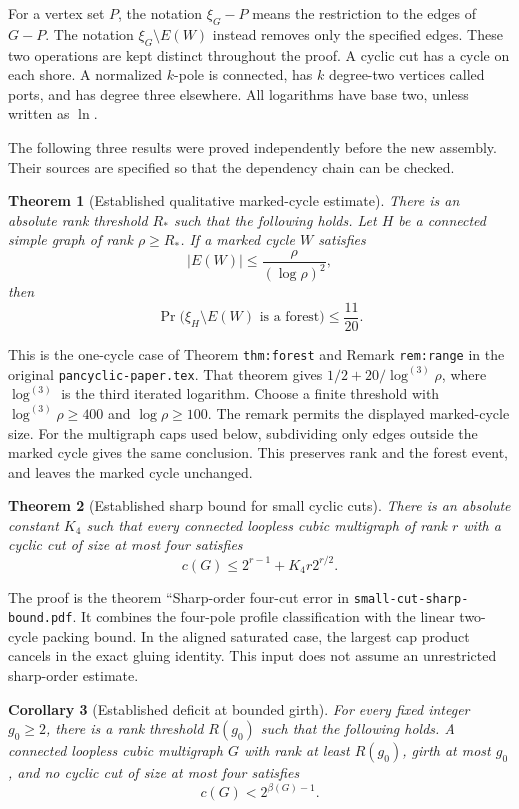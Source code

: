\documentclass[11pt]{article}
\newtheorem{theorem}{Theorem}[section]
\newtheorem{corollary}[theorem]{Corollary}
\begin{document}
For a vertex set $P$, the notation $\xi_G-P$ means the restriction to the edges of $G-P$.
The notation $\xi_G\setminus E(W)$ instead removes only the specified edges.
These two operations are kept distinct throughout the proof.
A cyclic cut has a cycle on each shore.
A normalized $k$-pole is connected, has $k$ degree-two vertices called ports, and has degree three elsewhere.
All logarithms have base two, unless written as $\ln$.

The following three results were proved independently before the new assembly.
Their sources are specified so that the dependency chain can be checked.

\begin{theorem}[Established qualitative marked-cycle estimate]
\label{thm:sharp-qualitative-forest-input}
There is an absolute rank threshold $R_*$ such that the following holds.
Let $H$ be a connected simple graph of rank $\rho\ge R_*$.
If a marked cycle $W$ satisfies
\[
 |E(W)|\le \frac{\rho}{(\log\rho)^2},
\]
then
\[
 \Pr\bigl(\xi_H\setminus E(W)\text{ is a forest}\bigr)\le\frac{11}{20}.
\]
\end{theorem}

This is the one-cycle case of Theorem \texttt{thm:forest} and Remark \texttt{rem:range} in the original \nolinkurl{pancyclic-paper.tex}.
That theorem gives $1/2+20/\log^{(3)}\rho$, where $\log^{(3)}$ is the third iterated logarithm.
Choose a finite threshold with $\log^{(3)}\rho\ge400$ and $\log\rho\ge100$.
The remark permits the displayed marked-cycle size.
For the multigraph caps used below, subdividing only edges outside the marked cycle gives the same conclusion.
This preserves rank and the forest event, and leaves the marked cycle unchanged.

\begin{theorem}[Established sharp bound for small cyclic cuts]
\label{thm:sharp-order-four-cut-error}
There is an absolute constant $K_4$ such that every connected loopless cubic multigraph of rank $r$ with a cyclic cut of size at most four satisfies
\[
 c(G)\le2^{r-1}+K_4r2^{r/2}.
\]
\end{theorem}

The proof is the theorem ``Sharp-order four-cut error in \nolinkurl{small-cut-sharp-bound.pdf}.
It combines the four-pole profile classification with the linear two-cycle packing bound.
In the aligned saturated case, the largest cap product cancels in the exact gluing identity.
This input does not assume an unrestricted sharp-order estimate.

\begin{corollary}[Established deficit at bounded girth]
\label{cor:path-unbounded-girth-reduction}
For every fixed integer $g_0\ge2$, there is a rank threshold $R(g_0)$ such that the following holds.
A connected loopless cubic multigraph $G$ with rank at least $R(g_0)$, girth at most $g_0$, and no cyclic cut of size at most four satisfies
\[
 c(G)<2^{\beta(G)-1}.
\]
\end{corollary}
\end{document}

